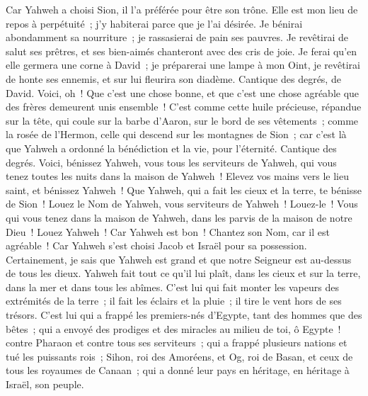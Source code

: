 \begin{multicols}{2}
Car Yahweh a choisi Sion, il l'a préférée pour être son trône.
Elle est mon lieu de repos à perpétuité~; j'y habiterai parce que je l'ai désirée.
Je bénirai abondamment sa nourriture~; je rassasierai de pain ses pauvres.
Je revêtirai de salut ses prêtres, et ses bien-aimés chanteront avec des cris de joie.
Je ferai qu'en elle germera une corne à David~; je préparerai une lampe à mon Oint,
je revêtirai de honte ses ennemis, et sur lui fleurira son diadème.
\VerseOne{}Cantique des degrés, de David. Voici, oh~! Que c'est une chose bonne, et que c'est une chose agréable que des frères demeurent unis ensemble~!
C'est comme cette huile précieuse, répandue sur la tête, qui coule sur la barbe d'Aaron, sur le bord de ses vêtements~;
comme la rosée de l'Hermon, celle qui descend sur les montagnes de Sion~; car c'est là que Yahweh a ordonné la bénédiction et la vie, pour l'éternité.
\VerseOne{}Cantique des degrés. Voici, bénissez Yahweh, vous tous les serviteurs de Yahweh, qui vous tenez toutes les nuits dans la maison de Yahweh~!
Elevez vos mains vers le lieu saint, et bénissez Yahweh~!
Que Yahweh, qui a fait les cieux et la terre, te bénisse de Sion~!
\VerseOne{}Louez le Nom de Yahweh, vous serviteurs de Yahweh~! Louez-le~!
Vous qui vous tenez dans la maison de Yahweh, dans les parvis de la maison de notre Dieu~!
Louez Yahweh~! Car Yahweh est bon~! Chantez son Nom, car il est agréable~!
Car Yahweh s'est choisi Jacob et Israël pour sa possession.
Certainement, je sais que Yahweh est grand et que notre Seigneur est au-dessus de tous les dieux.
Yahweh fait tout ce qu'il lui plaît, dans les cieux et sur la terre, dans la mer et dans tous les abîmes.
C'est lui qui fait monter les vapeurs des extrémités de la terre~; il fait les éclairs et la pluie~; il tire le vent hors de ses trésors.
C'est lui qui a frappé les premiers-nés d'Egypte, tant des hommes que des bêtes~;
qui a envoyé des prodiges et des miracles au milieu de toi, ô Egypte~! contre Pharaon et contre tous ses serviteurs~;
qui a frappé plusieurs nations et tué les puissants rois~;
Sihon, roi des Amoréens, et Og, roi de Basan, et ceux de tous les royaumes de Canaan~;
qui a donné leur pays en héritage, en héritage à Israël, son peuple.

\end{multicols}
